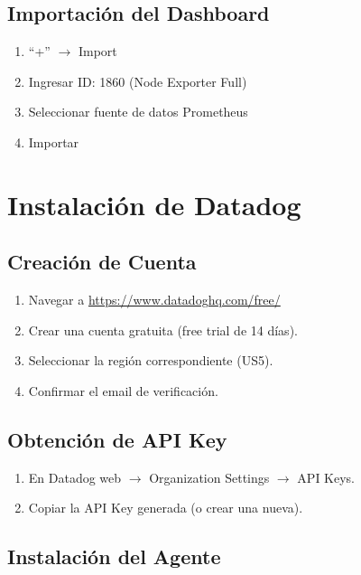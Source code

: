 \documentclass[12pt, a4paper]{article}
\begin{document}
\subsection{Importación del Dashboard}

\begin{enumerate}
    \item ``+'' $\rightarrow$ Import
    \item Ingresar ID: 1860 (Node Exporter Full)
    \item Seleccionar fuente de datos Prometheus
    \item Importar
\end{enumerate}

\newpage

\section{Instalación de Datadog}

\subsection{Creación de Cuenta}

\begin{enumerate}
    \item Navegar a \url{https://www.datadoghq.com/free/}
    \item Crear una cuenta gratuita (free trial de 14 días).
    \item Seleccionar la región correspondiente (US5).
    \item Confirmar el email de verificación.
\end{enumerate}

\subsection{Obtención de API Key}

\begin{enumerate}
    \item En Datadog web $\rightarrow$ Organization Settings $\rightarrow$ API Keys.
    \item Copiar la API Key generada (o crear una nueva).
\end{enumerate}

\subsection{Instalación del Agente}
\end{document}
